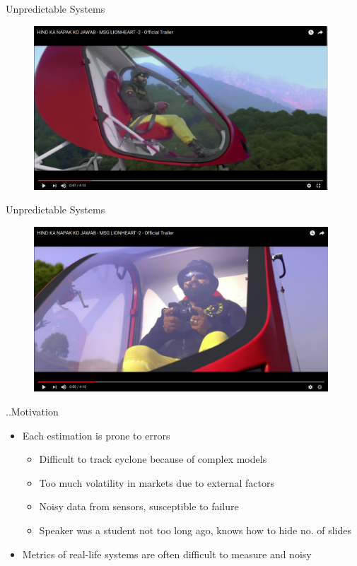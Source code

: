 \documentclass{beamer}
\begin{document}
\begin{frame}{Unpredictable Systems}
  \begin{figure} [ht!]
    \includegraphics[width=110mm]{images/msg1.png}
  \end{figure}
\vskip 1cm
\end{frame}
\begin{frame}{Unpredictable Systems}
  \begin{figure} [ht!]
    \includegraphics[width=110mm]{images/msg2.png}
  \end{figure}
\vskip 1cm
\end{frame}

\begin{frame}{..Motivation}

\begin{itemize}
  \item Each estimation is prone to errors
  \begin{itemize}
    \item Difficult to track cyclone because of complex models
    \item Too much volatility in markets due to external factors
    \item Noisy data from sensors, susceptible to failure
    \item Speaker was a student not too long ago, knows how to hide no. of slides
  \end{itemize}
  \item Metrics of real-life systems are often difficult to measure and noisy
\end{itemize}
\vskip 1cm
\end{frame}
\end{document}
